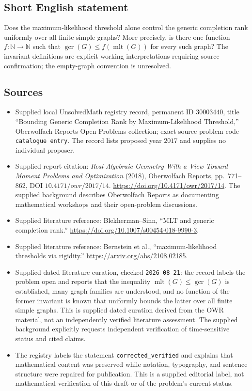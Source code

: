 \documentclass[11pt]{article}
\newcommand{\N}{\mathbb{N}}
\begin{document}
\subsection{Short English statement}
Does the maximum-likelihood threshold alone control the generic completion rank uniformly over all finite simple graphs? More precisely, is there one function \(f:\N\to\N\) such that \(\operatorname{gcr}(G)\leq f(\operatorname{mlt}(G))\) for every such graph? The invariant definitions are explicit working interpretations requiring source confirmation; the empty-graph convention is unresolved.
\subsection{Sources}
\begin{itemize}
\item Supplied local UnsolvedMath registry record, permanent ID \(30003440\), title ``Bounding Generic Completion Rank by Maximum-Likelihood Threshold,'' Oberwolfach Reports Open Problems collection; exact source problem code \texttt{catalogue entry}. The record lists proposed year \(2017\) and supplies no individual proposer.
\item Supplied report citation: \emph{Real Algebraic Geometry With a View Toward Moment Problems and Optimization} (2018), Oberwolfach Reports, pp.~771--862, DOI \(10.4171/owr/2017/14\). \url{https://doi.org/10.4171/owr/2017/14}. The supplied background describes Oberwolfach Reports as documenting mathematical workshops and their open-problem discussions.
\item Supplied literature reference: Blekherman--Sinn, ``MLT and generic completion rank.'' \url{https://doi.org/10.1007/s00454-018-9990-3}.
\item Supplied literature reference: Bernstein et al., ``maximum-likelihood thresholds via rigidity.'' \url{https://arxiv.org/abs/2108.02185}.
\item Supplied dated literature curation, checked \texttt{2026-08-21}: the record labels the problem open and reports that the inequality \(\operatorname{mlt}(G)\leq\operatorname{gcr}(G)\) is established, many graph families are understood, and no function of the former invariant is known that uniformly bounds the latter over all finite simple graphs. This is supplied dated curation derived from the OWR material, not an independently verified literature assessment. The supplied background explicitly requests independent verification of time-sensitive status and cited claims.
\item The registry labels the statement \texttt{corrected\_verified} and explains that mathematical content was preserved while notation, typography, and sentence structure were repaired for publication. This is a supplied editorial label, not mathematical verification of this draft or of the problem's current status.
\end{itemize}
\end{document}
